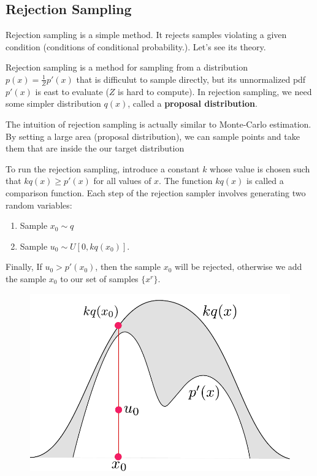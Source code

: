 \subsection{Rejection Sampling}
Rejection sampling is a simple method. It rejects samples violating a given condition (\eg conditions of conditional probability.). Let's see its theory. 

Rejection sampling is a method for sampling from a distribution $p(x)=\frac{1}{Z}p'(x)$ that is difficulut to sample directly, but its unnormalized pdf $p'(x)$ is east to evaluate ($Z$ is hard to compute). In rejection sampling, we need some simpler distribution $q(x)$, called a \textbf{proposal distribution}. 

The intuition of rejection sampling is actually similar to Monte-Carlo estimation. By setting a large area (proposal distribution), we can sample points and take them that are inside the our target distribution

To run the rejection sampling, introduce a constant $k$ whose value is chosen such that $kq(x)\geq p'(x)$ for all values of $x$. The function $kq(x)$ is called a comparison function. Each step of the rejection sampler involves generating two random variables:
	\begin{enumerate}
		\item Sample $x_0\sim q$
		\item Sample $u_0\sim U[0,kq(x_0)]$.
	\end{enumerate}
	Finally, If $u_0>p'(x_0)$, then the sample $x_0$ will be rejected, otherwise we add the sample $x_0$ to our set of samples $\{x^{r}\}$.

	\begin{figure}[h]
		\begin{center}
			\includegraphics[scale=0.5]{./images/sampling/rejection.pdf}
		\end{center}
	\end{figure}

